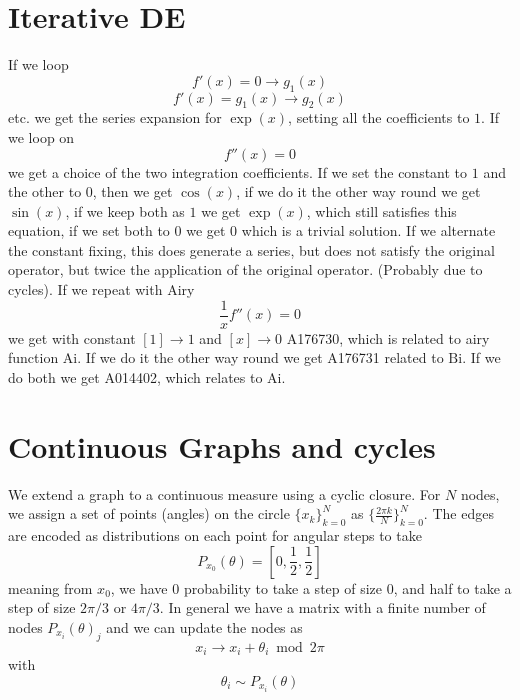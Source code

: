 \documentclass{article}
\begin{document}
\section{Iterative DE}
If we loop 
$$
f'(x) = 0 \to g_1(x)
$$
$$
f'(x) = g_1(x) \to g_2(x)
$$
etc. we get the series expansion for $\exp(x)$, setting all the coefficients to $1$. If we loop on 
$$
f''(x) = 0
$$
we get a choice of the two integration coefficients. If we set the constant to $1$ and the other to $0$, then we get $\cos(x)$, if we do it the other way round we get $\sin(x)$, if we keep both as $1$ we get $\exp(x)$, which still satisfies this equation, if we set both to $0$ we get $0$ which is a trivial solution. If we alternate the constant fixing, this does generate a series, but does not satisfy the original operator, but twice the application of the original operator. (Probably due to cycles). If we repeat with Airy 
$$
\frac{1}{x}f''(x) = 0
$$
we get with constant $[1] \to 1$ and $[x] \to 0$ A176730, which is related to airy function $\mathrm{Ai}$. If we do it the other way round we get  A176731 related to $\mathrm{Bi}$. If we do both we get A014402, which relates to Ai.

\section{Continuous Graphs and cycles}
We extend a graph to a continuous measure using a cyclic closure. 
For $N$ nodes, we assign a set of points (angles) on the circle $\{x_k\}_{k=0}^N$ as $\{\frac{2 \pi k}{N}\}_{k=0}^N$. The edges are encoded as distributions on each point for angular steps to take 
$$
P_{x_0}(\theta) = [0,\frac{1}{2},\frac{1}{2}]
$$
meaning from $x_0$, we have $0$ probability to take a step of size $0$, and half to take a step of size $2 \pi/3$ or $4 \pi /3$.
In general we have a matrix with a finite number of nodes $P_{x_i}(\theta)_j$ and we can update the nodes as 
$$
x_i \to x_i + \theta_i \bmod 2\pi
$$
with 
$$
\theta_i \sim P_{x_i}(\theta)
$$
\end{document}
